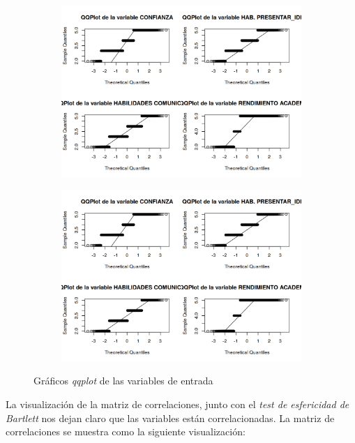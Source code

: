 \documentclass[11pt]{article}
\begin{document}
\begin{figure}[H]
    \centering
    \begin{subfigure}{0.45\textwidth}
    \includegraphics[width=1.0\textwidth]{graficos_qqplot}
    \end{subfigure}
    \begin{subfigure}{0.45\textwidth}
        \includegraphics[width=1.0\textwidth]{graficos_qqplot_segunda}
    \end{subfigure}

    \caption{Gráficos \textit{qqplot} de las variables de entrada}
\end{figure}

La visualización de la matriz de correlaciones, junto con el \textit{test de esfericidad de Bartlett} nos dejan claro que las variables están correlacionadas. La matriz de correlaciones se muestra como la siguiente visualización:
\end{document}
